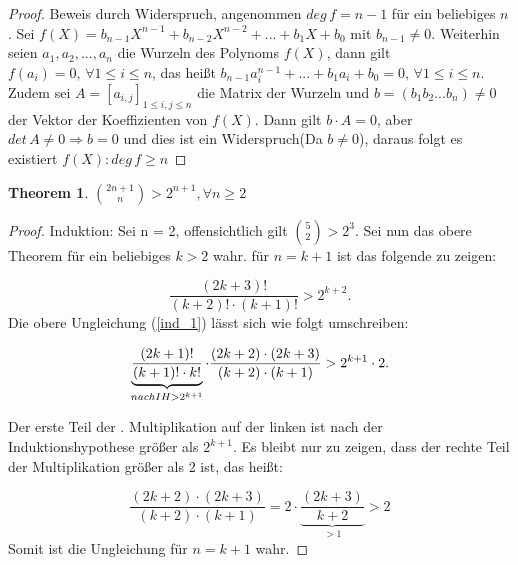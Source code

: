 \documentclass[12pt,oneside]{article}
\newtheorem{theorem}{Theorem}[section]
\theoremstyle{remark}
\theoremstyle{definition}
\begin{document}
\begin{proof}
Beweis durch Widerspruch, angenommen $deg \, f = n - 1$ für ein beliebiges $n$. Sei $f(X) = b_{n-1}X^{n-1} + b_{n-2}X^{n-2} + ... + b_1 X + b_0$ mit $b_{n-1} \neq 0$. Weiterhin seien $a_1,a_2,...,a_{n}$ die Wurzeln des Polynoms $f(X)$, dann gilt $f(a_i) = 0, \, \forall 1 \leq i \leq n$, das heißt $b_{n-1} a_i^{n-1} +...+ b_1 a_i + b_0 = 0, \, \forall 1 \leq i \leq n$. \newline\newline Zudem sei $A = [a_{i,j}]_{1 \leq i,j \leq n}$ die Matrix der Wurzeln und $b = (b_1 b_2 ...b_{n}) \neq 0$ der Vektor der Koeffizienten von $f(X)$. Dann gilt $b \cdot A = 0$, aber $det \, A \neq 0 \Rightarrow  b = 0$ und dies ist ein Widerspruch(Da $b \neq 0$), daraus folgt es existiert $f(X) : deg \, f \geq n$  
\end{proof}

\smallskip

\begin{flushleft}
\begin{theorem}
${2n + 1 \choose n} > 2^{n+1}, \forall n \geq 2$
\end{theorem}

\begin{proof}
Induktion: Sei n = 2, offensichtlich gilt ${5 \choose 2} > 2^3$. Sei nun das obere Theorem für ein beliebiges $k > 2 $ wahr.\newline\newline
für $n = k + 1$ ist das folgende zu zeigen: 

\begin{equation}\label{ind_1}
    \frac{(2k + 3)!}{(k + 2)!\cdot(k + 1)!} > 2^{k+2}.
\end{equation}
\newline\newline
Die obere Ungleichung (\ref{ind_1}) lässt sich wie folgt umschreiben:\newline\newline


\begin{equation}
     \underbrace{\frac{(2k + 1)!}{(k + 1)! \cdot k!}}_{nach IH > 2^{k + 1}} \cdot \frac{(2k + 2) \cdot (2k + 3)}{(k + 2) \cdot (k + 1)} > 2^{k+1} \cdot 2.\newline\newline
\end{equation}

Der erste Teil der . Multiplikation auf der linken ist nach der Induktionshypothese größer als $2^{k+1}$. Es bleibt nur zu zeigen, dass der rechte Teil der Multiplikation größer als 2 ist, das heißt: \newline\newline

\begin{equation}\label{ind_eq}
\frac{(2k + 2) \cdot (2k + 3)}{(k + 2) \cdot (k + 1)} = 2 \cdot \underbrace{\frac{(2k + 3 )}{k + 2}}_{ > 1} > 2
\end{equation}
Somit ist die Ungleichung für $n = k + 1$ wahr.
\end{proof}

\end{flushleft}
\end{document}
